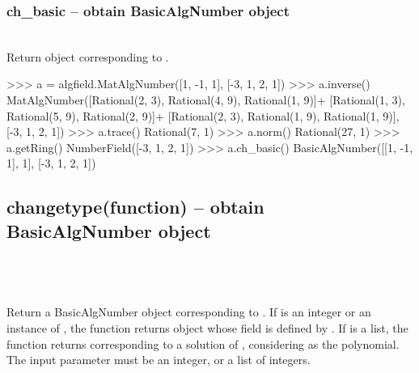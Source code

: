   \subsubsection{ch\_basic -- obtain BasicAlgNumber object}
  \\
  \spacing
  \quad Return  object corresponding to .\\
%
\begin{ex}
>>> a = algfield.MatAlgNumber([1, -1, 1], [-3, 1, 2, 1])
>>> a.inverse()
MatAlgNumber([Rational(2, 3), Rational(4, 9), Rational(1, 9)]+
[Rational(1, 3), Rational(5, 9), Rational(2, 9)]+
[Rational(2, 3), Rational(1, 9), Rational(1, 9)], [-3, 1, 2, 1])
>>> a.trace()
Rational(7, 1)
>>> a.norm()
Rational(27, 1)
>>> a.getRing()
NumberField([-3, 1, 2, 1])
>>> a.ch_basic()
BasicAlgNumber([[1, -1, 1], 1], [-3, 1, 2, 1])
\end{ex}
\C
  \subsection{changetype(function) -- obtain BasicAlgNumber object}
   \\
   \\
   \\
  \spacing
  \quad Return a BasicAlgNumber object corresponding to \param{a}.
  \spacing
  \spacing
  \quad If  is an integer or an instance of , the function returns  object whose field is defined by .
  If  is a list, the function returns  corresponding to a solution of , considering  as the polynomial.\\
  \spacing
  The input parameter  must be an integer,  or a list of integers.\\
%
